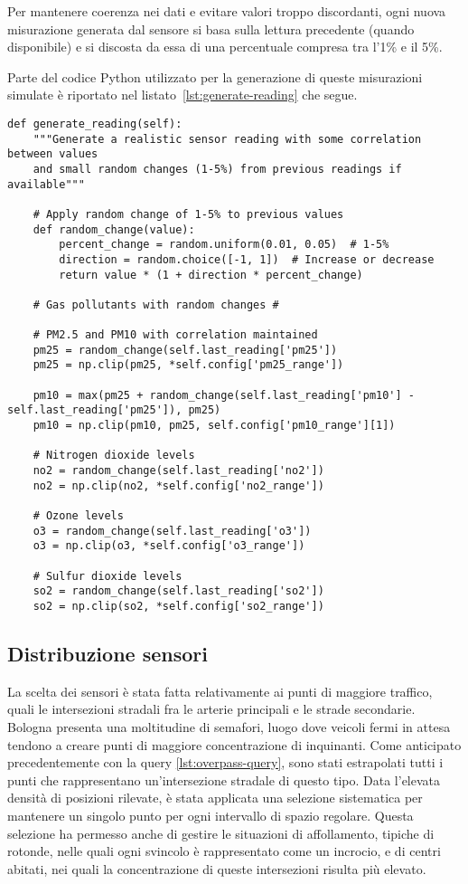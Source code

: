 Per mantenere coerenza nei dati e evitare valori troppo discordanti, ogni nuova misurazione generata dal sensore
si basa sulla lettura precedente (quando disponibile) e si discosta da essa di una percentuale compresa tra
l'1\% e il 5\%.

Parte del codice Python utilizzato per la generazione di queste misurazioni simulate è riportato
nel listato~\ref{lst:generate-reading} che segue.

\begin{lstlisting}[caption={Metodo per la generazione di pseudo-misurazioni}, label=lst:generate-reading]
  def generate_reading(self):
    """Generate a realistic sensor reading with some correlation between values
    and small random changes (1-5%) from previous readings if available"""

    # Apply random change of 1-5% to previous values
    def random_change(value):
        percent_change = random.uniform(0.01, 0.05)  # 1-5%
        direction = random.choice([-1, 1])  # Increase or decrease
        return value * (1 + direction * percent_change)

    # Gas pollutants with random changes #

    # PM2.5 and PM10 with correlation maintained
    pm25 = random_change(self.last_reading['pm25'])
    pm25 = np.clip(pm25, *self.config['pm25_range'])

    pm10 = max(pm25 + random_change(self.last_reading['pm10'] - self.last_reading['pm25']), pm25)
    pm10 = np.clip(pm10, pm25, self.config['pm10_range'][1])

    # Nitrogen dioxide levels
    no2 = random_change(self.last_reading['no2'])
    no2 = np.clip(no2, *self.config['no2_range'])

    # Ozone levels
    o3 = random_change(self.last_reading['o3'])
    o3 = np.clip(o3, *self.config['o3_range'])

    # Sulfur dioxide levels
    so2 = random_change(self.last_reading['so2'])
    so2 = np.clip(so2, *self.config['so2_range'])
\end{lstlisting}

\subsection{Distribuzione sensori}
\label{subsection:sensor-distribution}

La scelta dei sensori è stata fatta relativamente ai punti di maggiore traffico, quali le intersezioni stradali
fra le arterie principali e le strade secondarie. Bologna presenta una moltitudine di semafori, luogo dove veicoli
fermi in attesa tendono a creare punti di maggiore concentrazione di inquinanti. Come anticipato precedentemente
con la query \ref{lst:overpass-query}, sono stati estrapolati tutti i punti che rappresentano un'intersezione
stradale di questo tipo. Data l'elevata densità di posizioni rilevate, è stata applicata una selezione sistematica
per mantenere un singolo punto per ogni intervallo di spazio regolare.
Questa selezione ha permesso anche di gestire le situazioni di affollamento, tipiche di rotonde,
nelle quali ogni svincolo è rappresentato come un incrocio, e di centri abitati, nei quali la concentrazione
di queste intersezioni risulta più elevato.

